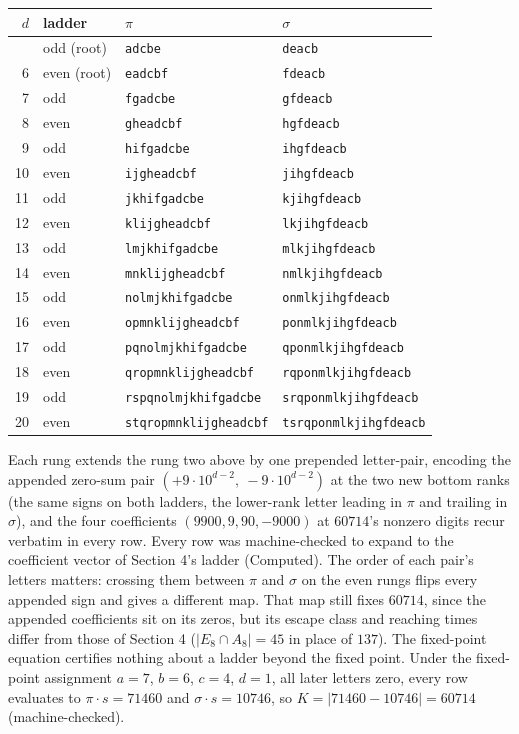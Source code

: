 \documentclass[11pt,letterpaper]{article}
\theoremstyle{paperstyle}
\theoremstyle{paperstyledef}
\theoremstyle{paperstylerem}
\begin{document}
{\def\LTcaptype{none} %
\begin{longtable}[]{@{}rlll@{}}
\toprule\noalign{}
\(d\) & ladder & \(\pi\) & \(\sigma\) \\
\midrule\noalign{}
\endhead
\bottomrule\noalign{}
\endlastfoot
5 & odd (root) & \texttt{adcbe} & \texttt{deacb} \\
6 & even (root) & \texttt{eadcbf} & \texttt{fdeacb} \\
7 & odd & \texttt{fgadcbe} & \texttt{gfdeacb} \\
8 & even & \texttt{gheadcbf} & \texttt{hgfdeacb} \\
9 & odd & \texttt{hifgadcbe} & \texttt{ihgfdeacb} \\
10 & even & \texttt{ijgheadcbf} & \texttt{jihgfdeacb} \\
11 & odd & \texttt{jkhifgadcbe} & \texttt{kjihgfdeacb} \\
12 & even & \texttt{klijgheadcbf} & \texttt{lkjihgfdeacb} \\
13 & odd & \texttt{lmjkhifgadcbe} & \texttt{mlkjihgfdeacb} \\
14 & even & \texttt{mnklijgheadcbf} & \texttt{nmlkjihgfdeacb} \\
15 & odd & \texttt{nolmjkhifgadcbe} & \texttt{onmlkjihgfdeacb} \\
16 & even & \texttt{opmnklijgheadcbf} & \texttt{ponmlkjihgfdeacb} \\
17 & odd & \texttt{pqnolmjkhifgadcbe} & \texttt{qponmlkjihgfdeacb} \\
18 & even & \texttt{qropmnklijgheadcbf} & \texttt{rqponmlkjihgfdeacb} \\
19 & odd & \texttt{rspqnolmjkhifgadcbe} & \texttt{srqponmlkjihgfdeacb} \\
20 & even & \texttt{stqropmnklijgheadcbf} & \texttt{tsrqponmlkjihgfdeacb} \\
\end{longtable}
}

Each rung extends the rung two above by one prepended letter-pair, encoding the appended zero-sum pair \((+9 \cdot 10^{d-2},\ -9 \cdot 10^{d-2})\) at the two new bottom ranks (the same signs on both ladders, the lower-rank letter leading in \(\pi\) and trailing in \(\sigma\)), and the four coefficients \((9900, 9, 90, -9000)\) at \(60714\)'s nonzero digits recur verbatim in every row. Every row was machine-checked to expand to the coefficient vector of Section 4's ladder (Computed). The order of each pair's letters matters: crossing them between \(\pi\) and \(\sigma\) on the even rungs flips every appended sign and gives a different map. That map still fixes \(60714\), since the appended coefficients sit on its zeros, but its escape class and reaching times differ from those of Section 4 (\(|E_8 \cap A_8| = 45\) in place of \(137\)). The fixed-point equation certifies nothing about a ladder beyond the fixed point. Under the fixed-point assignment \(a = 7\), \(b = 6\), \(c = 4\), \(d = 1\), all later letters zero, every row evaluates to \(\pi \cdot s = 71460\) and \(\sigma \cdot s = 10746\), so \(K = |71460 - 10746| = 60714\) (machine-checked).
\end{document}

